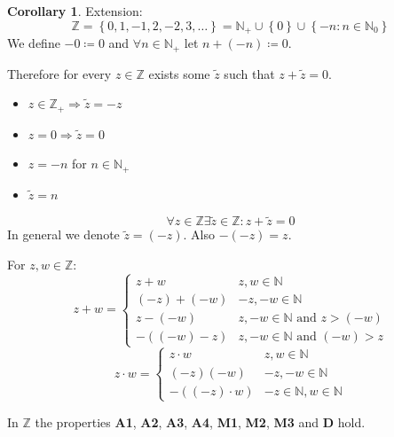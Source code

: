 \documentclass[a4paper,landscape,twocolumn]{article}
\theoremstyle{definition}
\newtheorem{cor}{Corollary}
\newcommand\set[1]{\left\{#1\right\}}
\begin{document}
\begin{cor}
  Extension:
  \[ \mathbb{Z} = \set{0, 1, -1, 2, -2, 3, \ldots} = \mathbb{N}_+ \cup \set{0} \cup \set{-n: n \in \mathbb N_0} \]
  We define $-0 \coloneqq 0$ and $\forall n \in \mathbb{N}_+$ let $n + (-n) \coloneqq 0$.

  Therefore for every $z \in \mathbb{Z}$ exists some $\tilde z$ such that $z + \tilde z = 0$.
  \begin{itemize}
    \item $z \in \mathbb{Z}_+ \Rightarrow \tilde z = -z$
    \item $z = 0 \Rightarrow \tilde z = 0$
    \item $z = -n$ for $n \in \mathbb{N}_+$
    \item $\tilde z = n$
  \end{itemize}
  \[ \forall z \in \mathbb{Z} \exists \tilde z \in \mathbb{Z}: z + \tilde z = 0 \]
  In general we denote $\tilde z = (-z)$.
  Also $-(-z) = z$.

  For $z,w \in \mathbb{Z}$:
  \[
    z + w =
    \begin{cases}
      z + w       & z,w \in \mathbb{N} \\
      (-z) + (-w) & -z, -w \in \mathbb{N} \\
      z - (-w)    & z, -w \in \mathbb{N} \text{ and } z > (-w) \\
      -((-w) - z) & z, -w \in \mathbb{N} \text{ and } (-w) > z
    \end{cases}
  \] \[
    z\cdot w =
    \begin{cases}
      z \cdot w       & z,w \in \mathbb{N} \\
      (-z)(-w)        & -z, -w \in \mathbb{N} \\
      -((-z) \cdot w) & -z \in \mathbb{N}, w \in \mathbb{N}
    \end{cases}
  \]

  In $\mathbb{Z}$ the properties \textbf{A1}, \textbf{A2}, \textbf{A3}, \textbf{A4},
  \textbf{M1}, \textbf{M2}, \textbf{M3} and \textbf{D} hold.
\end{cor}
\end{document}
